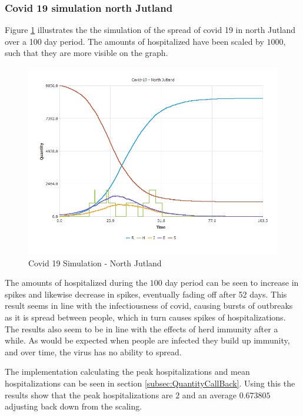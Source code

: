 \subsubsection{Covid 19 simulation north Jutland}
Figure \ref{fig:NorthJutland} illustrates the the simulation of the spread of covid 19 in north Jutland over a 100 day period.
The amounts of hospitalized have been scaled by $1000$, such that they are more visible on the graph.

\begin{figure}[h!]
	\includegraphics[scale=0.6]{images/Covid-19 - North Jutland.png}
	\centering
	\caption{Covid 19 Simulation - North Jutland}
	\label{fig:NorthJutland}
\end{figure}

The amounts of hospitalized during the $100$ day period can be seen to increase in spikes and likewise decrease in spikes, eventually fading off after 52 days. 
This result seems in line with the infectiousness of covid, causing bursts of outbreaks as it is spread between people, which in turn causes spikes of hospitalizations.
The results also seem to be in line with the effects of herd immunity after a while. As would be expected when people are infected they build up immunity, and over time, the virus has no ability to spread.

The implementation calculating the peak hospitalizations and mean hospitalizations can be seen in section \ref{subsec:QuantityCallBack}. Using this the results show that the peak hospitalizations are $2$ and an average $0.673805$ adjusting back down from the scaling.

